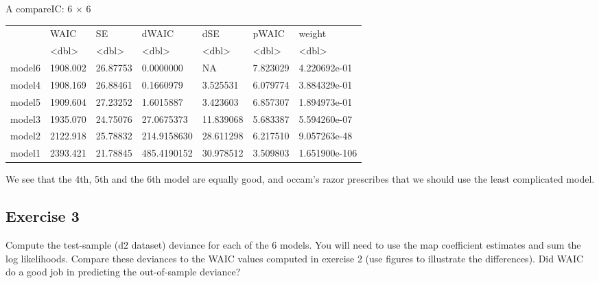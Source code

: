 \documentclass[11pt]{article}
\begin{document}
    A compareIC: 6 × 6
\begin{tabular}{r|llllll}
  & WAIC & SE & dWAIC & dSE & pWAIC & weight\\
  & <dbl> & <dbl> & <dbl> & <dbl> & <dbl> & <dbl>\\
\hline
	model6 & 1908.002 & 26.87753 &   0.0000000 &        NA & 7.823029 &  4.220692e-01\\
	model4 & 1908.169 & 26.88461 &   0.1660979 &  3.525531 & 6.079774 &  3.884329e-01\\
	model5 & 1909.604 & 27.23252 &   1.6015887 &  3.423603 & 6.857307 &  1.894973e-01\\
	model3 & 1935.070 & 24.75076 &  27.0675373 & 11.839068 & 5.683387 &  5.594260e-07\\
	model2 & 2122.918 & 25.78832 & 214.9158630 & 28.611298 & 6.217510 &  9.057263e-48\\
	model1 & 2393.421 & 21.78845 & 485.4190152 & 30.978512 & 3.509803 & 1.651900e-106\\
\end{tabular}


    
    We see that the 4th, 5th and the 6th model are equally good, and occam's
razor prescribes that we should use the least complicated model.

    \hypertarget{exercise-3}{%
\subsection{Exercise 3}\label{exercise-3}}

Compute the test-sample (d2 dataset) deviance for each of the 6 models.
You will need to use the map coefficient estimates and sum the log
likelihoods. Compare these deviances to the WAIC values computed in
exercise 2 (use figures to illustrate the differences). Did WAIC do a
good job in predicting the out-of-sample deviance?
\end{document}
